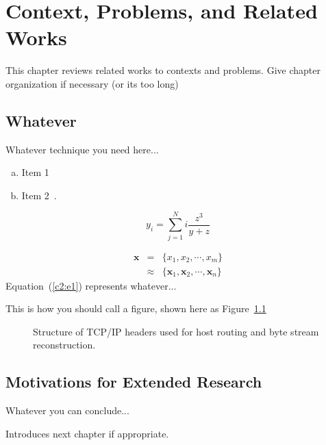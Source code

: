 \chapter{Context, Problems, and Related Works}\label{c2}%
This chapter reviews related works to contexts and problems. Give
chapter organization if necessary (or its too long)
%
\section{Whatever}\label{c2:s1} Whatever technique
you need here...

\begin{enumerate}[(a)]
\item Item 1
\item Item 2~\cite{j1}.
\end{enumerate}

\begin{equation}
y_i=\sum_{j=1}^Ni\frac{z^3}{y+z}
\end{equation}

\begin{subequations}
\label{c2:e1}
\begin{eqnarray}
\textbf{x} &=& \{x_1, x_2, \cdots, x_m\}
\\ &\approx&\{\textbf{x}_1, \textbf{x}_2,\cdots, \textbf{x}_n\}
\end{eqnarray}
\end{subequations}
%
Equation~(\ref{c2:e1}) represents whatever...

This is how you should call a figure, shown here as
Figure~\ref{c2:f1}

\begin{figure}[!ht]
    \caption[Structure of TCP/IP headers.]{Structure of TCP/IP headers used for host
    routing and byte stream reconstruction.}
    \label{c2:f1}
\end{figure}

\section{Motivations for Extended Research}\label{c2:s2}%
Whatever you can conclude...

Introduces next chapter if appropriate.
